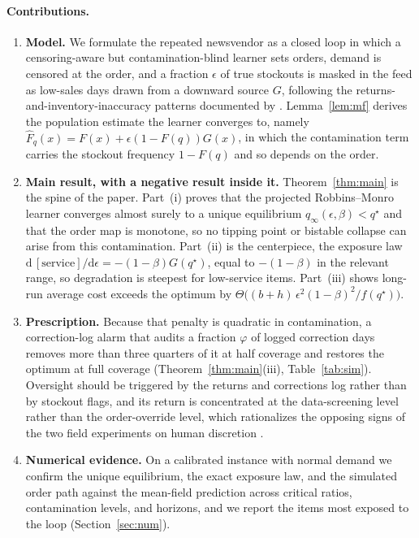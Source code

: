 \documentclass[11pt]{article}
\theoremstyle{plain}
\begin{document}
\paragraph{Contributions.}
\begin{enumerate}[leftmargin=1.5em,itemsep=0.35em,label=\textbf{\arabic*.}]
  \item \textbf{Model.} We formulate the repeated newsvendor as a closed loop in
  which a censoring-aware but contamination-blind learner sets orders, demand is
  censored at the order, and a fraction $\epsilon$ of true stockouts is masked in
  the feed as low-sales days drawn from a downward source $G$, following the
  returns-and-inventory-inaccuracy patterns documented by
  \citet{mersereau2015censored,dehoratius2008retail}. Lemma~\ref{lem:mf} derives
  the population estimate the learner converges to, namely
  $\widehat F_q(x)=F(x)+\epsilon(1-F(q))G(x)$, in which the contamination term
  carries the stockout frequency $1-F(q)$ and so depends on the order.

  \item \textbf{Main result, with a negative result inside it.}
  Theorem~\ref{thm:main} is the spine of the paper. Part~(i) proves that the
  projected Robbins--Monro learner converges almost surely to a unique equilibrium
  $q_\infty(\epsilon,\beta)<q^\star$ and that the order map is monotone, so no
  tipping point or bistable collapse can arise from this contamination. Part~(ii)
  is the centerpiece, the exposure law
  $\mathrm{d}\,[\text{service}]/\mathrm{d}\epsilon=-(1-\beta)G(q^\star)$, equal to
  $-(1-\beta)$ in the relevant range, so degradation is steepest for low-service
  items. Part~(iii) shows long-run average cost exceeds the optimum by
  $\Theta\!\big((b+h)\,\epsilon^2(1-\beta)^2/f(q^\star)\big)$.

  \item \textbf{Prescription.} Because that penalty is quadratic in contamination,
  a correction-log alarm that audits a fraction $\varphi$ of logged correction days
  removes more than three quarters of it at half coverage and restores the optimum
  at full coverage (Theorem~\ref{thm:main}(iii), Table~\ref{tab:sim}). Oversight
  should be triggered by the returns and corrections log rather than by stockout
  flags, and its return is concentrated at the data-screening level rather than
  the order-override level, which rationalizes the opposing signs of the two
  field experiments on human discretion
  \citep{kesavan2025judgmental,kesavan2020override}.

  \item \textbf{Numerical evidence.} On a calibrated instance with normal demand
  we confirm the unique equilibrium, the exact exposure law, and the simulated
  order path against the mean-field prediction across critical ratios,
  contamination levels, and horizons, and we report the items most exposed to the
  loop (Section~\ref{sec:num}).
\end{enumerate}
\end{document}
